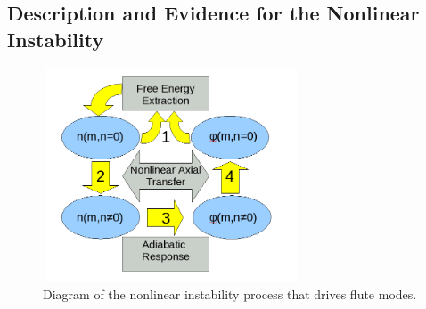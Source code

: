 \documentclass[showpacs,preprintnumbers,amsmath,amssymb,superscriptaddress,aip]{revtex4-1}
\begin{document}

\subsection{Description and Evidence for the Nonlinear Instability}

\begin{figure}
\includegraphics[width=3in,height=2.5in]{nl_instability_diagram}
\hfil
\caption{Diagram of the nonlinear instability process that drives flute modes.}
\label{nl_instability_diagram}
\end{figure}
\end{document}
